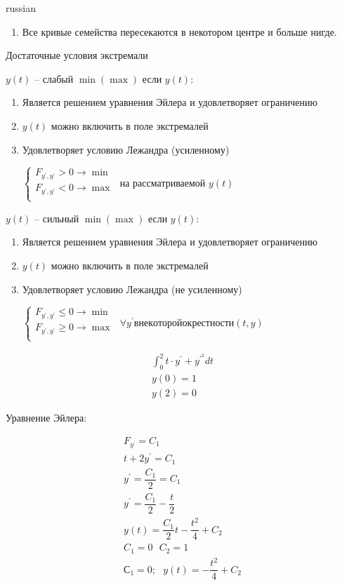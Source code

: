 \documentclass{article}
\begin{document}
\begin{otherlanguage*}{russian}
\begin{enumerate}
\begin{enumerate}
\item  Все кривые семейства пересекаются в некотором центре и больше нигде. 
\end{enumerate}

Достаточные условия экстремали 

$ y(t) $ -- слабый $ \min ( \max ) $ если $ y(t) $:
\begin{enumerate}
\item Является решением уравнения Эйлера и удовлетворяет ограничению 

\item $ y(t) $ можно включить в поле экстремалей 

\item Удовлетворяет условию Лежандра (усиленному) 

$ \begin{cases} 
F_{y^{'}, y^{'}} > 0 \rightarrow \min \\
F_{y^{'}, y^{'}} < 0 \rightarrow \max \\
\end{cases}
$ на рассматриваемой $ y(t) $ 
\end{enumerate}

$ y(t) $ -- сильный $ \min ( \max ) $ если $ y(t) $:
\begin{enumerate}
\item Является решением уравнения Эйлера и удовлетворяет ограничению 

\item $ y(t) $ можно включить в поле экстремалей 

\item Удовлетворяет условию Лежандра (не усиленному) 

$ \begin{cases} 
F_{y^{'}, y^{'}} \le 0 \rightarrow \min \\
F_{y^{'}, y^{'}} \ge 0 \rightarrow \max \\
\end{cases}
$ $\forall y^{'} в некоторой окрестности (t, y) $ 
\end{enumerate}
\end{enumerate}

\begin{align*}
\int_0^2 t \cdot y ^{'} + y ^{'^{2}} dt \\ 
y(0) = 1 \\ 
y(2) = 0 
\end{align*}

Уравнение Эйлера: 

\begin{align*}
F_{y^{'}} = C_1 \\ 
t + 2 y^{'} = C_1 \\ 
y^{'} = \dfrac{C_1}{2} = C_1 \\ 
y^{'} = \dfrac{C_1}{2} - \dfrac{t}{2} \\
y(t) = \dfrac{C_1}{2} t - \dfrac{t^2}{4} + C_2 \\ 
C_1 = 0 \,\,\,\, C_2 = 1 \\
С_1 = 0; \,\,\,\, y(t) = - \dfrac{t^2}{4} + C_2 
\end{align*}


\end{otherlanguage*}
\end{document}
